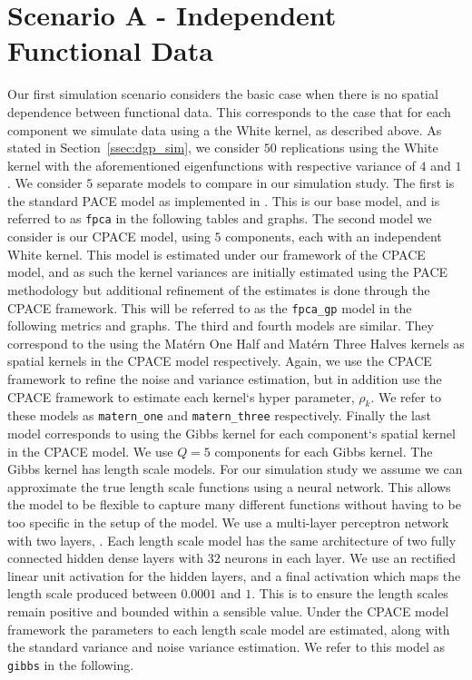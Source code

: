\section{Scenario A - Independent Functional Data \label{sec:sim_A}}
Our first simulation scenario considers the basic case when there is no spatial dependence between functional data.
This corresponds to the case that for each component we simulate data using a the White kernel, as described above.
As stated in Section~\ref{ssec:dgp_sim}, we consider $50$ replications using the White kernel with the aforementioned eigenfunctions with respective variance of $4$ and $1$. 
We consider $5$ separate models to compare in our simulation study.
The first is  the standard PACE model as implemented in \citep{yao_functional_2005}.
This is our base model, and is referred to as \verb*|fpca| in the following tables and graphs. 
The second model we consider is our CPACE model, using $5$ components, each with an independent White kernel.
This model is estimated under our framework of the CPACE model, and as such the kernel variances are initially estimated using the PACE methodology but additional refinement of the estimates is done through the CPACE framework.
This will be referred to as the \verb*|fpca_gp| model in the following metrics and graphs.
The third and fourth models are similar.
They correspond to the using the Mat\'ern One Half and Mat\'ern Three Halves kernels as spatial kernels in the CPACE model respectively.
Again, we use the CPACE framework to refine the noise and variance estimation, but in addition use the CPACE framework to estimate each kernel`s hyper parameter, $\rho_k$.
We refer to these models as \verb*|matern_one| and \verb*|matern_three| respectively.
Finally the last model corresponds to using the Gibbs kernel for each component`s spatial kernel in the CPACE model.
We use $Q=5$ components for each Gibbs kernel.
The Gibbs kernel has length scale models.
For our simulation study we assume we can approximate the true length scale functions using a neural network.
This allows the model to be flexible to capture many different functions without having to be too specific in the setup of the model.
We use a multi-layer perceptron network with two layers, \citep{hastie_elements_2009}.
Each length scale model has the same architecture of two fully connected hidden dense layers with $32$ neurons in each layer.
We use an rectified linear unit activation for the hidden layers, and a final activation which maps the length scale produced between $0.0001$ and $1$.
This is to ensure the length scales remain positive and bounded within a sensible value.
Under the CPACE model framework the parameters to each length scale model are estimated, along with the standard variance and noise variance estimation.
We refer to this model as \verb*|gibbs| in the following.

